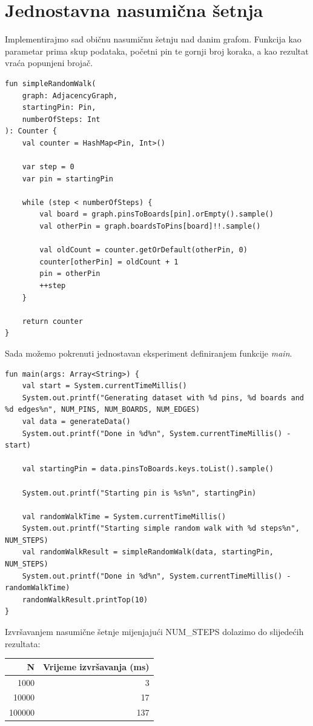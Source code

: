 \documentclass[times, utf8, seminar]{fer}
\begin{document}
\section{Jednostavna nasumična šetnja}

Implementirajmo sad običnu nasumičnu šetnju nad danim grafom. Funkcija kao parametar prima skup podataka, početni pin te gornji broj koraka, a kao rezultat vraća popunjeni brojač.

\begin{lstlisting}
fun simpleRandomWalk(
	graph: AdjacencyGraph,
	startingPin: Pin,
	numberOfSteps: Int
): Counter {
    val counter = HashMap<Pin, Int>()

    var step = 0
    var pin = startingPin

    while (step < numberOfSteps) {
        val board = graph.pinsToBoards[pin].orEmpty().sample()
        val otherPin = graph.boardsToPins[board]!!.sample()

        val oldCount = counter.getOrDefault(otherPin, 0)
        counter[otherPin] = oldCount + 1
        pin = otherPin
        ++step
    }

    return counter
}
\end{lstlisting}

Sada možemo pokrenuti jednostavan eksperiment definiranjem funkcije \textit{main}.

\begin{lstlisting}
fun main(args: Array<String>) {
    val start = System.currentTimeMillis()
    System.out.printf("Generating dataset with %d pins, %d boards and %d edges%n", NUM_PINS, NUM_BOARDS, NUM_EDGES)
    val data = generateData()
    System.out.printf("Done in %d%n", System.currentTimeMillis() - start)

    val startingPin = data.pinsToBoards.keys.toList().sample()

    System.out.printf("Starting pin is %s%n", startingPin)

    val randomWalkTime = System.currentTimeMillis()
    System.out.printf("Starting simple random walk with %d steps%n", NUM_STEPS)
    val randomWalkResult = simpleRandomWalk(data, startingPin, NUM_STEPS)
    System.out.printf("Done in %d%n", System.currentTimeMillis() - randomWalkTime)
    randomWalkResult.printTop(10)
}
\end{lstlisting}

Izvršavanjem nasumične šetnje mijenjajući NUM\_STEPS dolazimo do slijedećih rezultata:

\begin{center}
		  \begin{tabular}{ |r|r| }
					 \hline
					 N & Vrijeme izvršavanja (ms) \\
					 \hline
					 1000 & 3 \\
					 \hline
					 10000 & 17 \\
					 \hline
					 100000 & 137 \\
					 \hline
		  \end{tabular}
\end{center}
\end{document}
